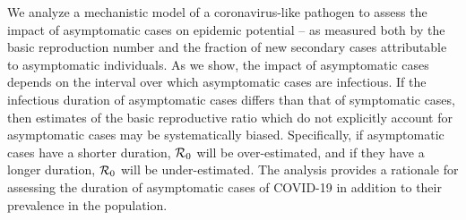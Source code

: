 {\footnotesize We analyze a mechanistic model of a coronavirus-like pathogen
to assess the impact of asymptomatic cases on epidemic potential
-- as measured both by the basic reproduction
number and the fraction of new secondary cases attributable to asymptomatic
individuals. As we show, the impact of asymptomatic
cases depends on the interval over which asymptomatic cases
are infectious.  If the infectious duration of asymptomatic cases differs than that 
of symptomatic cases, then estimates of the basic reproductive ratio which do not explicitly account for asymptomatic cases may be systematically biased. Specifically, if asymptomatic cases have a shorter duration, 
${\cal{R}}_0$ will be over-estimated, and if they have a longer duration, ${\cal{R}}_0$ will be under-estimated.
The analysis provides a rationale for assessing the duration of asymptomatic cases 
of COVID-19 in addition to their prevalence in the population.
}
